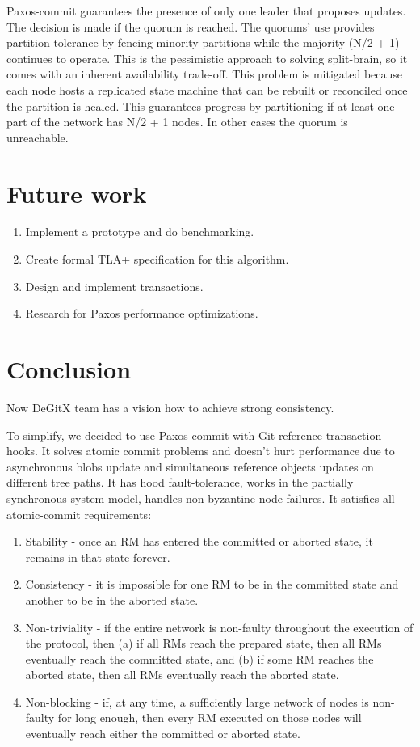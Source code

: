 \documentclass[sigplan, screen, nonacm, 11pt]{acmart}
\begin{document}
Paxos-commit guarantees the presence of only one leader that proposes updates.
The decision is made if the quorum is reached.
The quorums’ use provides partition tolerance by fencing minority partitions while the majority (N/2 + 1) continues to operate.
This is the pessimistic approach to solving split-brain,
so it comes with an inherent availability trade-off.
This problem is mitigated because each node hosts a replicated state machine that can be rebuilt or reconciled once the partition is healed.
This guarantees progress by partitioning if at least one part of the network has N/2 + 1 nodes. In other cases the quorum is unreachable.

\section{Future work}

\begin{enumerate}
  \item Implement a prototype and do benchmarking.
  \item Create formal TLA+ specification for this algorithm.
  \item Design and implement transactions.
  \item Research for Paxos performance optimizations.
\end{enumerate}

\section{Conclusion}

Now DeGitX team has a vision how to achieve strong consistency.

To simplify, we decided to use Paxos-commit with Git reference-transaction hooks.
It solves atomic commit problems and doesn't hurt performance due to asynchronous blobs update
and simultaneous reference objects updates on different tree paths.
It has hood fault-tolerance, works in the partially synchronous system model,
handles non-byzantine node failures. It satisfies all atomic-commit requirements:

\begin{enumerate}
  \item Stability - once an RM has entered the committed or aborted state, it remains in that state forever.
  \item Consistency - it is impossible for one RM to be in the committed state and another to be in
  the aborted state.
  \item Non-triviality - if the entire network is non-faulty throughout the execution of the protocol,
  then (a) if all RMs reach the prepared state, then all RMs eventually reach the committed state,
  and (b) if some RM reaches the aborted state,  then all RMs eventually reach the aborted state.
  \item Non-blocking - if, at any time, a sufficiently large network of nodes is non-faulty for long enough,
  then every RM executed on those nodes will eventually reach either the committed or aborted state.
\end{enumerate}

\newpage



\end{document}
